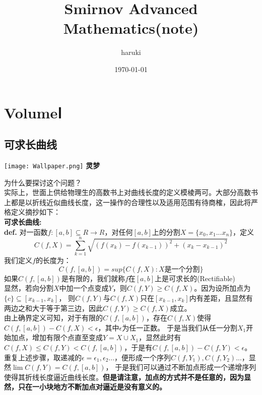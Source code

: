 \documentclass[utf8]{ctexart}
\title{Smirnov Advanced Mathematics(note)}
\author{haruki}
\date{\today}
\begin{document}
\maketitle
\tableofcontents
\newpage
\section{VolumeⅠ}
\subsection{可求长曲线}
\begin{center}
	\texttt{[image: Wallpaper.png]}
	\textbf{灵梦}
\end{center}
为什么要探讨这个问题？\\
实际上，世面上供给物理生的高数书上对曲线长度的定义模棱两可。大部分高数书上都是以折线近似曲线长度，这一操作的合理性以及适用范围有待商榷，因此将严格定义摘抄如下：\\
\textbf{可求长曲线:\\def.}
对一函数$f:[a,b]\subseteq R\to R$，对任何$[a,b]$上的分割$X=\{x_{0},x_{1}...x_{n}\}$，定义
$$
C(f,X)=\sum_{k=1}^{n}\sqrt{(f(x_{k})-f(x_{k-1}))^{2}+(x_{k}-x_{k-1})^{2}}
$$
我们定义$f$的长度为：
$$
C(f,[a,b])=sup\{C(f,X):X\text{是一个分割}\}
$$
如果$C(f,[a,b])$是有限的，我们就称$f$在$[a,b]$上是可求长的(Rectifiable)\\
显然，若向分割$X$中加一个点变成$Y$，则$C(f,Y)\ge C(f,X)$。因为设所加点为$\{c\}\subseteq [x_{k-1},x_{k}]$，
则$C(f,Y)$与$C(f,X)$只在$[x_{k-1},x_{k}]$内有差距，且显然有两边之和大于等于第三边，因此$C(f,Y)\ge C(f,X)$成立。\\
由上确界定义可知，对于有限的$C(f,[a,b])$，存在$C(f,X)$使得$C(f,[a,b])-C(f,X)<\epsilon$，其中$\epsilon$为任一正数。
于是当我们从任一分割$X_1$开始加点，增加有限个点直至变成$Y=X\cup X_1$，显然此时有$C(f,X)\le C(f,Y)<C(f,[a,b])$，于是有$C(f,[a,b])-C(f,Y)<\epsilon$。\\
重复上述步骤，取递减的$\epsilon=\epsilon_1,\epsilon_2...$，便形成一个序列$C(f,Y_1),C(f,Y_2)...$，显然$\lim C(f,Y)=C(f,[a,b])$，
于是我们可以通过不断加点形成一个递增序列使得其折线长度逼近曲线长度。\textbf{但是请注意，加点的方式并不是任意的，因为显然，只在一小块地方不断加点对逼近是没有意义的。}\\
\end{document}

